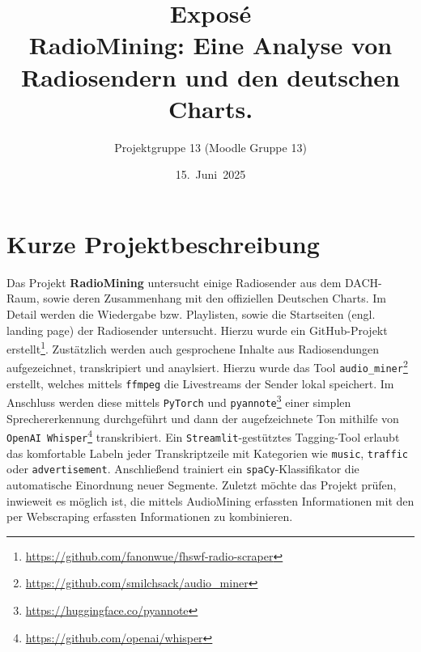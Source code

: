\documentclass[ngerman,a4paper,11pt,parskip=half]{scrartcl}
\title{Expos\'e\\RadioMining: Eine Analyse von Radiosendern und den deutschen Charts.}
\author{Projektgruppe 13 (Moodle Gruppe 13)}
\date{15.~Juni~2025}
\begin{document}
\maketitle

\section*{Kurze Projektbeschreibung}
Das Projekt \textbf{\glqq RadioMining\grqq{}} untersucht einige Radiosender aus dem DACH-Raum, sowie deren
Zusammenhang mit den offiziellen Deutschen Charts. Im Detail werden die Wiedergabe\- bzw. Playlisten, 
sowie die Startseiten (engl. landing page) der Radiosender untersucht. Hierzu wurde ein GitHub-Projekt 
erstellt\footnote{\url{https://github.com/fanonwue/fhswf-radio-scraper}}. \newline
Zustätzlich werden auch gesprochene Inhalte aus Radiosendungen aufgezeichnet, transkripiert und anaylsiert.
Hierzu wurde das Tool \texttt{audio\_miner}\footnote{\url{https://github.com/smilchsack/audio_miner}} 
erstellt,  welches mittels \texttt{ffmpeg} die Livestreams der Sender lokal speichert. Im Anschluss werden diese mittels 
\texttt{PyTorch} und \texttt{pyannote}\footnote{\url{https://huggingface.co/pyannote}} 
einer simplen Sprechererkennung durchgeführt und dann der augefzeichnete Ton mithilfe von
\texttt{OpenAI~Whisper}\footnote{\url{https://github.com/openai/whisper}} transkribiert.\newline
Ein \texttt{Streamlit}-gestütztes Tagging-Tool 
erlaubt das komfortable Labeln jeder Transkriptzeile 
mit Kategorien wie \texttt{music}, \texttt{traffic} oder \texttt{advertisement}. 
Anschließend trainiert ein \texttt{spaCy}-Klassifikator die automatische Einordnung neuer Segmente.\newline
Zuletzt möchte das Projekt prüfen, inwieweit es möglich ist, die mittels Audio\-Mining erfassten Informationen
mit den per Webscraping erfassten Informationen zu kombinieren.
\newline
\end{document}

